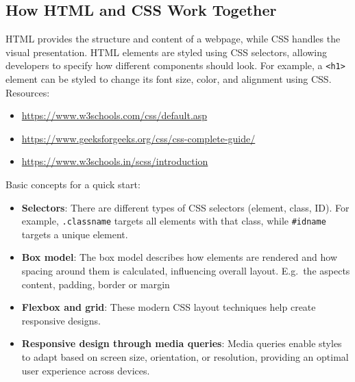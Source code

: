 \subsection*{How HTML and CSS Work Together}

HTML provides the structure and content of a webpage, while CSS handles the visual presentation.
HTML elements are styled using CSS selectors, allowing developers to specify how different components should look.
For example, a \texttt{<h1>} element can be styled to change its font size, color, and alignment using CSS. \\
Resources:
\begin{itemize}
    \item \url{https://www.w3schools.com/css/default.asp}
    \item \url{https://www.geeksforgeeks.org/css/css-complete-guide/}
    \item \url{https://www.w3schools.in/scss/introduction}
\end{itemize}
Basic concepts for a quick start:
\begin{itemize}
    \item \textbf{Selectors}: There are different types of CSS selectors (element, class, ID). For example, \texttt{.classname} targets all elements with that class, while \texttt{\#idname} targets a unique element.

    \item \textbf{Box model}: The box model describes how elements are rendered and how spacing around them is
    calculated, influencing overall layout.
    E.g.\ the aspects content, padding, border or margin

    \item \textbf{Flexbox and grid}: These modern CSS layout techniques help create responsive designs.

    \item \textbf{Responsive design through media queries}: Media queries enable styles to adapt based on screen size,
    orientation, or resolution, providing an optimal user experience across devices.
\end{itemize}

